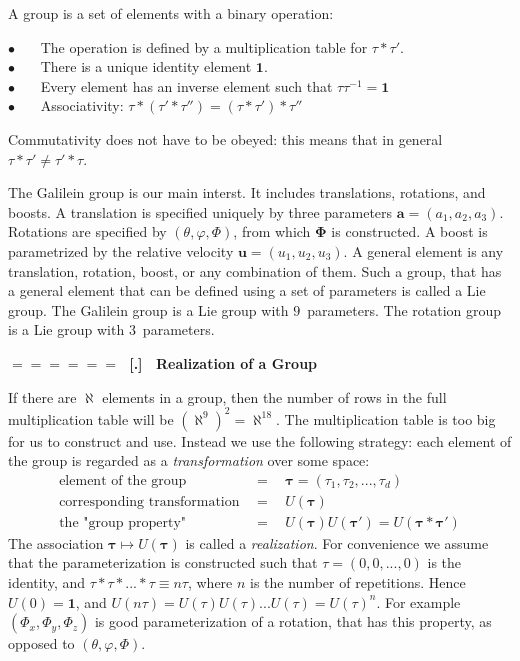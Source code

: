 \documentclass[onecolumn,fleqn]{revtex4}
\newcommand{\bitem}{$\bullet$ \ \ \ }
\newcommand{\beq}{\begin{eqnarray}}
\newcommand{\eeq}{\end{eqnarray}}
\renewcommand{\thesubsection}{\arabic{subsection}}
\renewcommand{\thesubsubsection}{\arabic{subsubsection}}
\newcommand{\sheadC}[1]
{
\addtocounter{subsubsection}{1}
\vspace{5mm}
{\Large\bf $=\!=\!=\!=\!=\!=\;$ [\thesubsection.\thesubsubsection] \ #1}  
\nopagebreak
\phantomsection
}
\begin{document}
A group is a set of elements with a binary operation: 

\bitem The operation is defined by a multiplication table for ${\tau* \tau'}$. \\
\bitem There is a unique identity element ${\mathbf{1}}$. \\
\bitem Every element has an inverse element such that ${\tau \tau^{-1}=\mathbf{1}}$ \\
\bitem Associativity: ${\tau *(\tau'*\tau'') = (\tau*\tau')*\tau''}$

Commutativity does not have to be obeyed:  
this means that in general ${\tau *\tau'\neq\tau'*\tau}$. 

The Galilein group is our main interst. It includes translations, rotations, and boosts. 
A translation is specified uniquely by three parameters ${\mathbf{a}=(a_1,a_2,a_3)}$. 
Rotations are specified by ${(\theta,\varphi,\Phi)}$, 
from which ${\mathbf{\Phi}}$ is constructed.
A boost is parametrized by the relative velocity ${\mathbf{u}=(u_1,u_2,u_3)}$.
A general element is any translation, rotation, boost, or any combination of them. 
Such a group, that has a general element that can be defined using 
a set of parameters is called a Lie group. 
The Galilein group is a Lie group with $9$~parameters. 
The rotation group is a Lie group with $3$~parameters. 


 
\sheadC{Realization of a Group} 

If there are ${\aleph}$ elements in a group, 
then the number of rows in the full multiplication 
table will be ${(\aleph^9)^2=\aleph^{18}}$. 
The multiplication table is too big for us 
to construct and use. Instead we use the following 
strategy: each element of the group 
is regarded as a {\em transformation} over some space:
\beq
\mbox{element of the group} \ \ &=& \ \ \bm{\tau} = (\tau_1,\tau_2, ... ,\tau_d) \\
\mbox{corresponding transformation} \ \ &=& \ \ U(\bm{\tau}) \\
\mbox{the "group property"} \ \ &=& \ \ U(\bm{\tau}) U(\bm{\tau}') =  U(\bm{\tau}*\bm{\tau}') 
\eeq
The association $\bm{\tau}\mapsto U(\bm{\tau})$ is called a {\em realization}. 
For convenience we assume that the parameterization is constructed 
such that ${\tau=(0,0,...,0)}$ is the identity,  
and $\tau*\tau*...*\tau \equiv n\tau$, 
where $n$ is the number of repetitions. 
Hence ${U(0)=\bm{1}}$, and ${U(n\tau)=U(\tau)U(\tau)...U(\tau) = U(\tau)^n}$. 
For example $(\Phi_x,\Phi_y,\Phi_z)$ is good parameterization of 
a rotation, that has this property, as opposed to $(\theta,\varphi,\Phi)$.  
\end{document}
